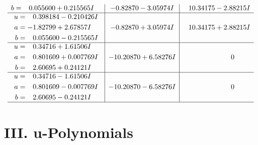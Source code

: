 \documentclass[1p]{elsarticle_modified}
\theoremstyle{definition}
\begin{document}
$$\begin{array}{c|c|c}
\begin{aligned}
b &= \phantom{-}0.055600 + 0.215565 I\end{aligned}
 & -0.82870 - 3.05974 I & \phantom{-}10.34175 - 2.88215 I \\ \hline\begin{aligned}
u &= \phantom{-}0.398184 - 0.210426 I \\
a &= -1.82799 + 2.67857 I \\
b &= \phantom{-}0.055600 - 0.215565 I\end{aligned}
 & -0.82870 + 3.05974 I & \phantom{-}10.34175 + 2.88215 I \\ \hline\begin{aligned}
u &= \phantom{-}0.34716 + 1.61506 I \\
a &= \phantom{-}0.801609 + 0.007769 I \\
b &= \phantom{-}2.60695 + 0.24121 I\end{aligned}
 & -10.20870 + 6.58276 I & \phantom{-0.000000 } 0 \\ \hline\begin{aligned}
u &= \phantom{-}0.34716 - 1.61506 I \\
a &= \phantom{-}0.801609 - 0.007769 I \\
b &= \phantom{-}2.60695 - 0.24121 I\end{aligned}
 & -10.20870 - 6.58276 I & \phantom{-0.000000 } 0\\
 \hline 
 \end{array}$$\newpage
\newpage\renewcommand{\arraystretch}{1}
\centering \section*{ III. u-Polynomials}
\end{document}
